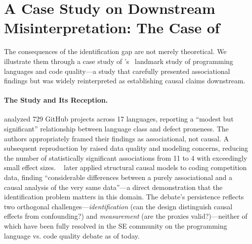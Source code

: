 \section{A Case Study on Downstream Misinterpretation: The Case of \citet{DBLP:conf/sigsoft/RayPFD14, DBLP:journals/cacm/RayPDF17}}
\label{sec:appendix-misinterpretation}

The consequences of the identification gap are not merely theoretical.
We illustrate them through a case study of \citeauthor{DBLP:conf/sigsoft/RayPFD14}'s~\cite{DBLP:conf/sigsoft/RayPFD14, DBLP:journals/cacm/RayPDF17} landmark study of programming languages and code quality---a study that carefully presented associational findings but was widely reinterpreted as establishing causal claims downstream.

\paragraph{The Study and Its Reception.}
\citet{DBLP:conf/sigsoft/RayPFD14} analyzed 729 GitHub projects across 17 languages, reporting a ``modest but significant'' relationship between language class and defect proneness.
The authors appropriately framed their findings as associational, not causal.
A subsequent reproduction by \citet{DBLP:journals/toplas/BergerHMVV19} raised data quality and modeling concerns, reducing the number of statistically significant associations from 11 to 4 with exceedingly small effect sizes.
\citeauthor{DBLP:journals/tosem/FuriaTF24}~\cite{DBLP:journals/tosem/FuriaTF24} later applied structural causal models to coding competition data, finding ``considerable differences between a purely associational and a causal analysis of the very same data''---a direct demonstration that the identification problem matters in this domain.
The debate's persistence reflects two orthogonal challenges---\emph{identification} (can the design distinguish causal effects from confounding?) and \emph{measurement} (are the proxies valid?)---neither of which have been fully resolved in the SE community on the programming language vs. code quality debate as of today.

